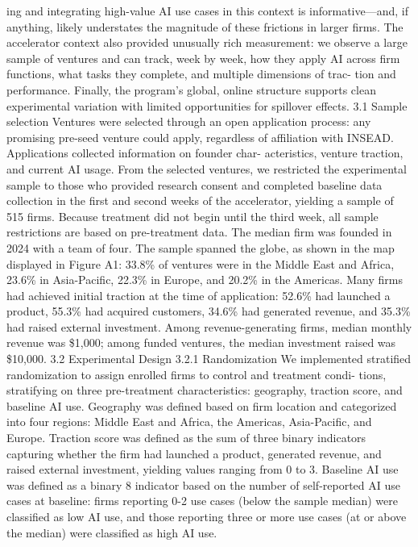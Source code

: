 ing and integrating high-value AI use cases in this context is informative—and, if anything, likely
understates the magnitude of these frictions in larger firms. The accelerator context also provided
unusually rich measurement: we observe a large sample of ventures and can track, week by week,
how they apply AI across firm functions, what tasks they complete, and multiple dimensions of trac-
tion and performance. Finally, the program’s global, online structure supports clean experimental
variation with limited opportunities for spillover effects.
3.1
Sample selection
Ventures were selected through an open application process: any promising pre-seed venture could
apply, regardless of affiliation with INSEAD. Applications collected information on founder char-
acteristics, venture traction, and current AI usage. From the selected ventures, we restricted the
experimental sample to those who provided research consent and completed baseline data collection
in the first and second weeks of the accelerator, yielding a sample of 515 firms. Because treatment
did not begin until the third week, all sample restrictions are based on pre-treatment data.
The median firm was founded in 2024 with a team of four. The sample spanned the globe, as
shown in the map displayed in Figure A1: 33.8\% of ventures were in the Middle East and Africa,
23.6\% in Asia-Pacific, 22.3\% in Europe, and 20.2\% in the Americas. Many firms had achieved initial
traction at the time of application: 52.6\% had launched a product, 55.3\% had acquired customers,
34.6\% had generated revenue, and 35.3\% had raised external investment. Among revenue-generating
firms, median monthly revenue was \$1,000; among funded ventures, the median investment raised
was \$10,000.
3.2
Experimental Design
3.2.1
Randomization
We implemented stratified randomization to assign enrolled firms to control and treatment condi-
tions, stratifying on three pre-treatment characteristics: geography, traction score, and baseline AI
use. Geography was defined based on firm location and categorized into four regions: Middle East
and Africa, the Americas, Asia-Pacific, and Europe. Traction score was defined as the sum of three
binary indicators capturing whether the firm had launched a product, generated revenue, and raised
external investment, yielding values ranging from 0 to 3. Baseline AI use was defined as a binary
8
indicator based on the number of self-reported AI use cases at baseline: firms reporting 0-2 use
cases (below the sample median) were classified as low AI use, and those reporting three or more
use cases (at or above the median) were classified as high AI use.
